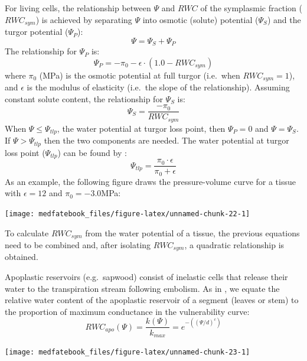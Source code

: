\documentclass[]{book}
\begin{document}
For living cells, the relationship between \(\Psi\) and \(RWC\) of the symplasmic fraction (\(RWC_{sym}\)) is achieved by separating \(\Psi\) into osmotic (solute) potential (\(\Psi_{S}\)) and the turgor potential (\(\Psi_{P}\)):
\begin{equation}
\Psi = \Psi_{S} + \Psi_{P}
\end{equation}
The relationship for \(\Psi_{P}\) is:
\begin{equation}
\Psi_{P} = -\pi_0 -\epsilon\cdot (1.0 - RWC_{sym})
\end{equation}
where \(\pi_0\) (MPa) is the osmotic potential at full turgor (i.e.~when \(RWC_{sym} = 1\)), and \(\epsilon\) is the modulus of elasticity (i.e.~the slope of the relationship). Assuming constant solute content, the relationship for \(\Psi_{S}\) is:
\begin{equation}
\Psi_{S} = \frac{-\pi_0}{RWC_{sym}} 
\end{equation}
When \(\Psi \leq \Psi_{tlp}\), the water potential at turgor loss point, then \(\Psi_{P} = 0\) and \(\Psi = \Psi_{S}\). If \(\Psi > \Psi_{tlp}\) then the two components are needed. The water potential at turgor loss point (\(\Psi_{tlp}\)) can be found by \citep{Bartlett2012}:
\begin{equation}
\Psi_{tlp} = \frac{\pi_0 \cdot \epsilon}{\pi_0 + \epsilon}
\end{equation}
As an example, the following figure draws the pressure-volume curve for a tissue with \(\epsilon = 12\) and \(\pi_0 = -3.0\)MPa:

\begin{center}\texttt{[image: medfatebook\_files/figure-latex/unnamed-chunk-22-1]} \end{center}

To calculate \(RWC_{sym}\) from the water potential of a tissue, the previous equations need to be combined and, after isolating \(RWC_{sym}\), a quadratic relationship is obtained.

Apoplastic reservoirs (e.g.~sapwood) consist of inelastic cells that release their water to the transpiration stream following embolism. As in \citet{Holtta2009}, we equate the relative water content of the apoplastic reservoir of a segment (leaves or stem) to the proportion of maximum conductance in the vulnerability curve:
\begin{equation}
RWC_{apo}(\Psi) = \frac{k(\Psi)}{k_{max}} = e^{-((\Psi/d)^{c})}
\end{equation}

\begin{center}\texttt{[image: medfatebook\_files/figure-latex/unnamed-chunk-23-1]} \end{center}
\end{document}
